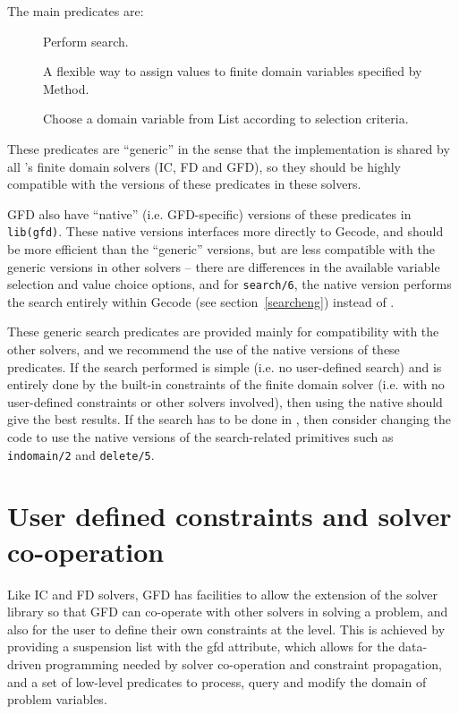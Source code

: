 The main predicates are:

\begin{description}
\item[] 
Perform search.

\item[] 
A flexible way to assign values to finite domain variables specified
 by Method.

\item[]
Choose a domain variable from List according to selection criteria.

\end{description}

These predicates are ``generic'' in the sense that the implementation is shared
by all \eclipse's finite domain solvers (IC, FD and GFD), so they should be
highly compatible with the versions of these predicates in these solvers.

GFD also have ``native'' (i.e. GFD-specific) versions of these predicates
in {\tt lib(gfd)}. These native versions interfaces more directly to Gecode,
and should be more efficient than the ``generic'' versions, but are less 
compatible with the generic versions in other solvers -- there are differences
in the available variable selection and value choice options, and for 
{\tt search/6}, the native version performs the search entirely within
Gecode (see section~\ref{searcheng}) instead of \eclipse.

These generic search predicates are provided mainly for compatibility with
the other solvers, and we recommend the use of the native versions of these
predicates. If the search performed is simple (i.e. no user-defined search)
and is entirely done by the 
built-in constraints of the finite domain solver (i.e. with no user-defined 
constraints or other solvers involved), then using the native 
 should give the best results. If the search
has to be done in \eclipse, then consider changing the code to use the native 
versions of the search-related primitives such as {\tt indomain/2} and {\tt delete/5}.


\section{User defined constraints and solver co-operation}
Like IC and FD solvers, GFD has facilities to allow the extension of the 
solver library so that GFD can co-operate with other solvers in solving a
problem, and also for the user to define their own constraints at the \eclipse
level. This is achieved by providing a suspension list with the gfd attribute,
which allows for the data-driven programming needed by solver co-operation and
constraint propagation, and a set of low-level predicates to process,
 query and  modify the domain of problem variables.

